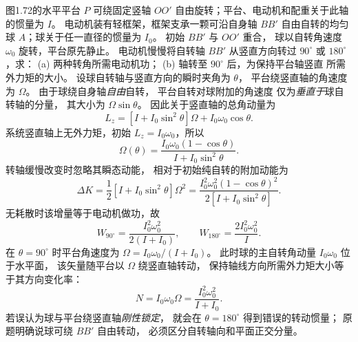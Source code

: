 图1.72的水平平台 $P$ 可绕固定竖轴 $OO'$
自由旋转；平台、电动机和配重关于此轴的惯量为 $I$。
电动机装有轻框架，框架支承一颗可沿自身轴 $BB'$
自由自转的均匀球 $A$；球关于任一直径的惯量为 $I_0$。
初始 $BB'$ 与 $OO'$ 重合，
球以自转角速度 $\omega_0$ 旋转，平台原先静止。
电动机慢慢将自转轴 $BB'$ 从竖直方向转过
$90^\circ$ 或 $180^\circ$，求：
(a) 两种转角所需电动机功；
(b) 轴转至 $90^\circ$ 后，为保持平台轴竖直
所需外力矩的大小。
\exsolution
设球自转轴与竖直方向的瞬时夹角为 $\theta$，
平台绕竖直轴的角速度为 $\Omega$。
由于球绕自身轴\emph{自由}自转，
平台自转对球附加的角速度
仅为\emph{垂直于}球自转轴的分量，
其大小为 $\Omega\sin\theta$。
因此关于竖直轴的总角动量为
\[
L_z=[I+I_0\sin^2\theta]\Omega
+I_0\omega_0\cos\theta.
\]
系统竖直轴上无外力矩，初始
$L_z=I_0\omega_0$，所以
\[
\Omega(\theta)=
\frac{I_0\omega_0(1-\cos\theta)}
{I+I_0\sin^2\theta}.
\]
转轴缓慢改变时忽略其瞬态动能，
相对于初始纯自转的附加动能为
\[
\Delta K=\frac12[I+I_0\sin^2\theta]\Omega^2
=\frac{I_0^2\omega_0^2(1-\cos\theta)^2}
{2[I+I_0\sin^2\theta]}.
\]
无耗散时该增量等于电动机做功，故
\[
\boxed{W_{90^\circ}=
\frac{I_0^2\omega_0^2}{2(I+I_0)}},\qquad
\boxed{W_{180^\circ}=\frac{2I_0^2\omega_0^2}{I}}.
\]
在 $\theta=90^\circ$ 时平台角速度为
$\Omega=I_0\omega_0/(I+I_0)$。
此时球的主自转角动量
$I_0\omega_0$ 位于水平面，
该矢量随平台以 $\Omega$ 绕竖直轴转动，
保持轴线方向所需外力矩大小等于其方向变化率：
\[
\boxed{N=I_0\omega_0\Omega
=\frac{I_0^2\omega_0^2}{I+I_0}}.
\]
\excheck 若误认为球与平台绕竖直轴\emph{刚性锁定}，
就会在 $\theta=180^\circ$ 得到错误的转动惯量；
原题明确说球可绕 $BB'$ 自由转动，
必须区分自转轴向和平面正交分量。
